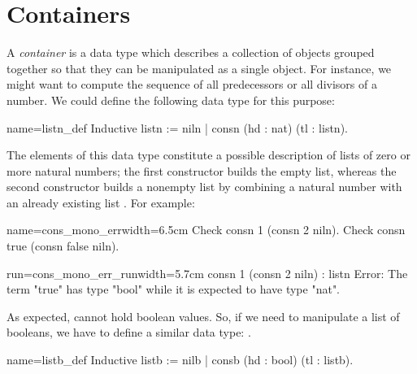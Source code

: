 

\section{Containers}\label{sec:poly}


A \emph{container} is a data type which describes a collection of
objects grouped together so that they can be manipulated as a single
object. For instance, we might want to compute the sequence of all
predecessors or all divisors of a number.  We could define the
following data type for this purpose:

\begin{coq}{name=listn_def}{}
Inductive listn := niln | consn (hd : nat) (tl : listn).
\end{coq}

The elements of this data type constitute a possible description of
lists of zero or more natural numbers; the first constructor
 builds the empty list, whereas the second constructor
 builds a nonempty list by combining a natural number 
with an already existing list .
For example:

\begin{coq-left}{name=cons_mono_err}{width=6.5cm}
Check consn 1 (consn 2 niln).
Check consn true (consn false niln).
$~$
$~$
\end{coq-left}{}{}
\begin{coqout-right}{run=cons_mono_err_run}{width=5.7cm}
consn 1 (consn 2 niln) : listn
Error: The term "true" has
type "bool" while it is
expected to have type "nat".
\end{coqout-right}{}{}

As expected,  %
cannot hold boolean values.
So, if we need to manipulate a list of booleans,
we have to define a similar data type:
.

\begin{coq}{name=listb_def}{}
Inductive listb := nilb | consb (hd : bool) (tl : listb).
\end{coq}

